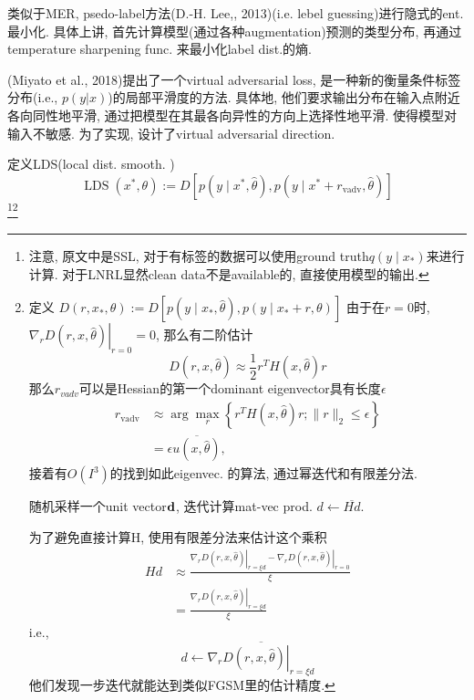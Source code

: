 \documentclass{article}
\begin{document}
类似于MER, psedo-label方法(D.-H.   Lee,, 2013)(i.e. lebel guessing)进行隐式的ent.最小化. 具体上讲, 首先计算模型(通过各种augmentation)预测的类型分布, 再通过temperature sharpening func. 来最小化label dist.的熵.

(Miyato et al., 2018)提出了一个virtual adversarial loss, 是一种新的衡量条件标签分布(i.e., $p(y|x)$)的局部平滑度的方法. 具体地, 他们要求输出分布在输入点附近各向同性地平滑, 通过把模型在其最各向异性的方向上选择性地平滑. 使得模型对输入不敏感. 
为了实现, 设计了virtual adversarial direction.

定义LDS(local dist. smooth. )
\begin{equation}
    \operatorname{LDS}\left(x^{*}, \theta\right):=D\left[p\left(y \mid x^{*}, \hat{\theta}\right), p\left(y \mid x^{*}+r_{\mathrm{vadv}}, \hat \theta\right)\right]
\end{equation}
\footnote{
    注意, 原文中是SSL, 对于有标签的数据可以使用ground truth$q\left(y \mid x_{*}\right)$来进行计算. 对于LNRL显然clean data不是available的, 直接使用模型的输出.
}\footnote{
     定义
    $D\left(r, x_{*}, \theta\right) := D\left[p\left(y \mid x_{*}, \hat{\theta}\right), p\left(y \mid x_{*}+r, \theta\right)\right]$
    由于在$r=0$时, $\left.\nabla_{r} D(r, x, \hat{\theta})\right|_{r=0}=0$, 那么有二阶估计
    \begin{equation}
        D(r, x, \hat{\theta}) \approx \frac{1}{2} r^{T} H(x, \hat{\theta}) r
    \end{equation}
    那么$r_{vadv}$可以是Hessian的第一个dominant eigenvector具有长度$\epsilon$
    \begin{equation}
        \begin{aligned}
        r_{\mathrm{vadv}} & \approx \arg \max _{r}\left\{r^{T} H(x, \hat{\theta}) r ;\|r\|_{2} \leq \epsilon\right\} \\
        &=\epsilon \overline{u(x, \hat{\theta})},
        \end{aligned}
    \end{equation}
    接着有$O(I^3)$的找到如此eigenvec. 的算法, 通过幂迭代和有限差分法.

    随机采样一个unit vector$\textbf{d}$, 迭代计算mat-vec prod. 
    $d \leftarrow \overline{H d}$.

    为了避免直接计算H, 使用有限差分法来估计这个乘积
    \begin{equation}
        \begin{aligned}
        H d & \approx \frac{\left.\nabla_{r} D(r, x, \hat{\theta})\right|_{r=\xi d}-\left.\nabla_{r} D(r, x, \hat{\theta})\right|_{r=0}}{\xi} \\
        &=\frac{\left.\nabla_{r} D(r, x, \hat{\theta})\right|_{r=\xi d}}{\xi}
        \end{aligned}
    \end{equation}
    i.e.,
    \begin{equation}
        d \leftarrow \overline{\left.\nabla_{r} D(r, x, \hat{\theta})\right|_{r=\xi d}}
    \end{equation}
    他们发现一步迭代就能达到类似FGSM里的估计精度.
}
\end{document}
